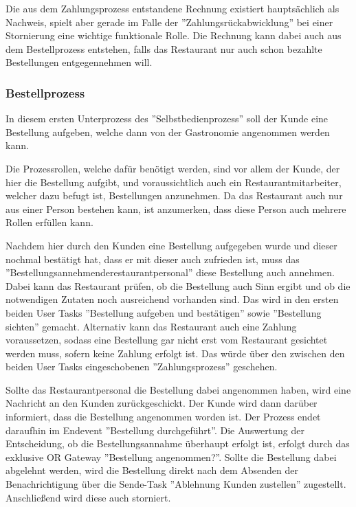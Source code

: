 Die aus dem Zahlungsprozess entstandene Rechnung existiert hauptsächlich als Nachweis, spielt aber gerade im Falle der ''Zahlungsrückabwicklung'' bei einer Stornierung eine wichtige funktionale Rolle. Die Rechnung kann dabei auch aus dem Bestellprozess entstehen, falls das Restaurant nur auch schon bezahlte Bestellungen entgegennehmen will.

\subsubsection{Bestellprozess}
In diesem ersten Unterprozess des ''Selbstbedienprozess'' soll der Kunde eine Bestellung aufgeben, welche dann von der Gastronomie angenommen werden kann. 

Die Prozessrollen, welche dafür benötigt werden, sind vor allem der Kunde, der hier die Bestellung aufgibt, und voraussichtlich auch  ein Restaurantmitarbeiter, welcher dazu befugt ist, Bestellungen anzunehmen. Da das Restaurant auch nur aus einer Person bestehen kann, ist anzumerken, dass diese Person auch mehrere Rollen erfüllen kann.

\clearpage
{}


Nachdem hier durch den Kunden eine Bestellung aufgegeben wurde und dieser nochmal bestätigt hat, dass er mit dieser auch zufrieden ist, muss das ''Bestellungsannehmenderestaurantpersonal'' diese Bestellung auch annehmen. Dabei kann das Restaurant prüfen, ob die Bestellung auch Sinn ergibt und ob die notwendigen Zutaten noch ausreichend vorhanden sind. Das wird in den ersten beiden User Tasks ''Bestellung aufgeben und bestätigen'' sowie ''Bestellung sichten'' gemacht. Alternativ kann das Restaurant auch eine Zahlung voraussetzen, sodass eine Bestellung gar nicht erst vom Restaurant gesichtet werden muss, sofern keine Zahlung erfolgt ist. Das würde über den zwischen den beiden User Tasks eingeschobenen ''Zahlungsprozess'' geschehen.

Sollte das Restaurantpersonal die Bestellung dabei angenommen haben, wird eine Nachricht an den Kunden zurückgeschickt.  Der Kunde wird dann darüber informiert, dass die Bestellung angenommen worden ist. Der Prozess endet daraufhin im Endevent ''Bestellung durchgeführt''. Die Auswertung der Entscheidung, ob die Bestellungsannahme überhaupt erfolgt ist, erfolgt durch das exklusive OR Gateway ''Bestellung angenommen?''. Sollte die Bestellung dabei abgelehnt werden, wird die Bestellung direkt nach dem Absenden der Benachrichtigung über die Sende-Task ''Ablehnung Kunden zustellen'' zugestellt. Anschließend wird diese auch storniert.

